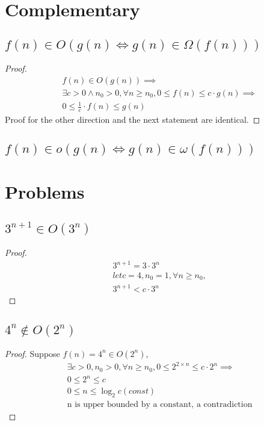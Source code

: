 \documentclass{article}
\begin{document}
\section{Complementary}
\subsection{$f(n) \in O(g(n) \iff g(n) \in \Omega(f(n)))$}
\begin{proof}
    \begin{align*}
        & f(n) \in O(g(n)) \implies \\
        & \exists c > 0 \land n_0 > 0, \forall n \geq n_0, 0 \leq f(n) \leq c \cdot g(n) \implies \\
        & 0 \leq \frac{1}{c}\cdot f(n) \leq g(n)
    \end{align*}
Proof for the other direction and the next statement are identical.
\end{proof}
\subsection{$f(n) \in o(g(n) \iff g(n) \in \omega(f(n)))$}

\section{Problems}
\subsection*{$3^{n + 1} \in O(3^n)$}
\begin{proof}
    \begin{align*}
        & 3^{n+ 1} = 3 \cdot 3^n\\
        & let c = 4, n_0 = 1, \forall n \geq n_0, \\
        & 3^{n+1} < c\cdot 3^n
    \end{align*}
\end{proof}
\subsection*{$4^n \notin O(2^n)$}
\begin{proof}
    Suppose $f(n) = 4^n \in O(2^n)$,\\
    \begin{align*}
        & \exists c > 0, n_0 > 0, \forall n \geq n_0, 0 \leq 2^{2 \times n} \leq c\cdot 2^n \implies\\
        & 0 \leq 2^n \leq c\\
        & 0 \leq n \leq \log_2c (const)\\
        & \text{n is upper bounded by a constant, a contradiction}
    \end{align*}
\end{proof}
\end{document}
